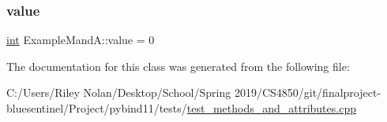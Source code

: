 \subsubsection{\texorpdfstring{value}{value}}
{\footnotesize\ttfamily \mbox{\hyperlink{warnings_8h_a74f207b5aa4ba51c3a2ad59b219a423b}{int}} Example\+Mand\+A\+::value = 0}



The documentation for this class was generated from the following file\+:\begin{DoxyCompactItemize}
\item 
C\+:/\+Users/\+Riley Nolan/\+Desktop/\+School/\+Spring 2019/\+C\+S4850/git/finalproject-\/bluesentinel/\+Project/pybind11/tests/\mbox{\hyperlink{test__methods__and__attributes_8cpp}{test\+\_\+methods\+\_\+and\+\_\+attributes.\+cpp}}\end{DoxyCompactItemize}
